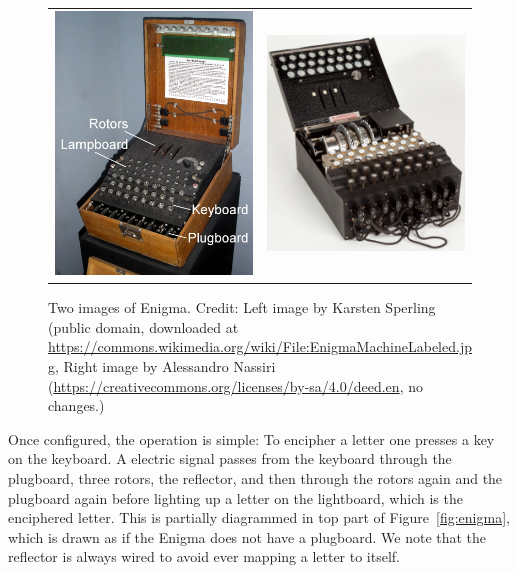 \documentclass[11pt]{article}
\begin{document}
\begin{figure}[ht]
    \begin{center}
        \begin{tabular}{cc}
            \includegraphics[width=6cm]{enigma-case.jpg}
            &
            \includegraphics[width=6cm]{enigma-no-case.jpg}
        \end{tabular}
    \end{center}
    \caption{Two images of Enigma. Credit: Left image by Karsten Sperling (public domain, downloaded at \protect\url{https://commons.wikimedia.org/wiki/File:EnigmaMachineLabeled.jpg}, Right image by Alessandro Nassiri (\protect\url{https://creativecommons.org/licenses/by-sa/4.0/deed.en}, no changes.)}
    \label{fig:photos}
\end{figure}

Once configured, the operation is simple: To encipher a letter one presses a
key on the keyboard. A electric signal passes from the keyboard through the
plugboard, three rotors, the reflector, and then through the rotors again and
the plugboard again before lighting up a letter on the lightboard, which is the
enciphered letter. This is partially diagrammed in top part of
Figure~\ref{fig:enigma}, which is drawn as if the Enigma does not have a
plugboard. We note that the reflector is always wired to avoid ever mapping
a letter to itself.
\end{document}
